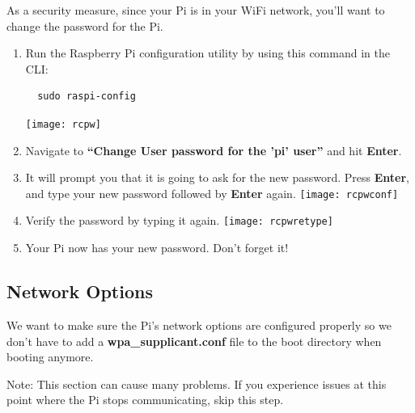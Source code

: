 \documentclass{article}
\begin{document}
As a security measure, since your Pi is in your WiFi network, you'll want to change the password for the Pi.

\begin{enumerate}
  \item Run the Raspberry Pi configuration utility by using this command in the CLI:
  \begin{lstlisting}
  sudo raspi-config
  \end{lstlisting}
  \texttt{[image: rcpw]}
  \item Navigate to \textbf{``Change User password for the 'pi' user''} and hit \textbf{Enter}.
  \item It will prompt you that it is going to ask for the new password. Press \textbf{Enter}, and type your new password followed by \textbf{Enter} again.
  \newline
  \newline
  \texttt{[image: rcpwconf]}
  \item Verify the password by typing it again.
  \newline
  \newline
  \texttt{[image: rcpwretype]}
  \item Your Pi now has your new password. Don't forget it!
\end{enumerate}

\subsection{Network Options}

We want to make sure the Pi's network options are configured properly so we don't have to add a \textbf{wpa\_supplicant.conf} file to the boot directory when booting anymore.

Note: This section can cause many problems. If you experience issues at this point where the Pi stops communicating, skip this step. 
\end{document}
